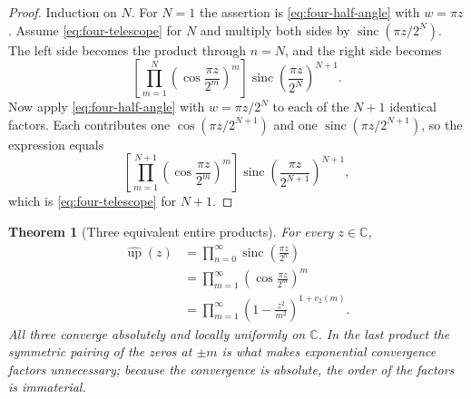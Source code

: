 \documentclass[11pt,oneside]{article}
\newtheorem{theorem}{Theorem}[section]
\theoremstyle{definition}
\theoremstyle{remark}
\newcommand{\C}{\mathbb C}
\newcommand{\Up}{\operatorname{up}}
\newcommand{\sinc}{\operatorname{sinc}}
\newcommand{\vtwo}{v_2}
\begin{document}
\begin{proof}
Induction on $N$.  For $N=1$ the assertion is \eqref{eq:four-half-angle} with $w=\pi z$.
Assume \eqref{eq:four-telescope} for $N$ and multiply both sides by
$\sinc(\pi z/2^N)$.  The left side becomes the product through $n=N$, and the right side
becomes
\begin{equation*}
 \left[\prod_{m=1}^{N}\left(\cos\frac{\pi z}{2^m}\right)^{m}\right]
 \sinc\!\left(\frac{\pi z}{2^{N}}\right)^{N+1}.
\end{equation*}
Now apply \eqref{eq:four-half-angle} with $w=\pi z/2^N$ to each of the $N+1$ identical
factors.  Each contributes one $\cos(\pi z/2^{N+1})$ and one $\sinc(\pi z/2^{N+1})$, so the
expression equals
\begin{equation*}
 \left[\prod_{m=1}^{N+1}\left(\cos\frac{\pi z}{2^m}\right)^{m}\right]
 \sinc\!\left(\frac{\pi z}{2^{N+1}}\right)^{N+1},
\end{equation*}
which is \eqref{eq:four-telescope} for $N+1$.
\end{proof}

\begin{theorem}[Three equivalent entire products]
\label{thm:four-products}
For every $z\in\C$,
\begin{align}
 \widehat{\Up}(z)
 &=\prod_{n=0}^{\infty}\sinc\!\left(\frac{\pi z}{2^n}\right)
   \label{eq:four-product-sinc}\\
 &=\prod_{m=1}^{\infty}\left(\cos\frac{\pi z}{2^m}\right)^{m}
   \label{eq:four-product-cos}\\
 &=\prod_{m=1}^{\infty}
   \left(1-\frac{z^2}{m^2}\right)^{1+\vtwo(m)}.
   \label{eq:four-product-canonical}
\end{align}
All three converge absolutely and locally uniformly on $\C$.  In the last product the
symmetric pairing of the zeros at $\pm m$ is what makes exponential convergence factors
unnecessary; because the convergence is absolute, the order of the factors is immaterial.
\end{theorem}
\end{document}
